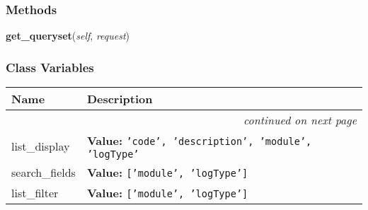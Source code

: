
  \subsubsection{Methods}

    \label{GroundSegment:admin:LogAdmin:get_queryset}

    \vspace{0.5ex}

\hspace{.8\funcindent}\begin{boxedminipage}{\funcwidth}

    \raggedright \textbf{get\_queryset}(\textit{self}, \textit{request})

\setlength{\parskip}{2ex}
\setlength{\parskip}{1ex}
    \end{boxedminipage}



  \subsubsection{Class Variables}

    \vspace{-1cm}
\hspace{\varindent}\begin{longtable}{|p{\varnamewidth}|p{\vardescrwidth}|l}
\cline{1-2}
\cline{1-2} \centering \textbf{Name} & \centering \textbf{Description}& \\
\cline{1-2}
\endhead\cline{1-2}\multicolumn{3}{r}{\small\textit{continued on next page}}\\\endfoot\cline{1-2}
\endlastfoot\raggedright l\-i\-s\-t\-\_\-d\-i\-s\-p\-l\-a\-y\- & \raggedright \textbf{Value:} 
{\tt 'code', 'description', 'module', 'logType'}&\\
\cline{1-2}
\raggedright s\-e\-a\-r\-c\-h\-\_\-f\-i\-e\-l\-d\-s\- & \raggedright \textbf{Value:} 
{\tt ['module', 'logType']}&\\
\cline{1-2}
\raggedright l\-i\-s\-t\-\_\-f\-i\-l\-t\-e\-r\- & \raggedright \textbf{Value:} 
{\tt ['module', 'logType']}&\\
\cline{1-2}
\end{longtable}

